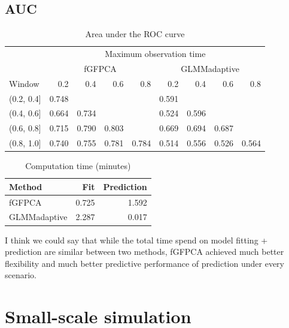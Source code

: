 \documentclass[
]{article}
\begin{document}
\hypertarget{auc}{%
\subsection{AUC}\label{auc}}

\begin{table}

\caption{\label{tab:unnamed-chunk-6}Area under the ROC curve}
\centering
\begin{tabular}[t]{lrrrrrrrr}
\toprule
\multicolumn{1}{c}{ } & \multicolumn{8}{c}{Maximum observation time} \\
\cmidrule(l{3pt}r{3pt}){2-9}
\multicolumn{1}{c}{ } & \multicolumn{4}{c}{fGFPCA} & \multicolumn{4}{c}{GLMMadaptive} \\
\cmidrule(l{3pt}r{3pt}){2-5} \cmidrule(l{3pt}r{3pt}){6-9}
Window & 0.2 & 0.4 & 0.6 & 0.8 & 0.2 & 0.4 & 0.6 & 0.8\\
\midrule
(0.2, 0.4] & 0.748 &  &  &  & 0.591 &  &  & \\
(0.4, 0.6] & 0.664 & 0.734 &  &  & 0.524 & 0.596 &  & \\
(0.6, 0.8] & 0.715 & 0.790 & 0.803 &  & 0.669 & 0.694 & 0.687 & \\
(0.8, 1.0] & 0.740 & 0.755 & 0.781 & 0.784 & 0.514 & 0.556 & 0.526 & 0.564\\
\bottomrule
\end{tabular}
\end{table}

\begin{table}

\caption{\label{tab:time}Computation time (minutes)}
\centering
\begin{tabular}[t]{lrr}
\toprule
Method & Fit & Prediction\\
\midrule
fGFPCA & 0.725 & 1.592\\
GLMMadaptive & 2.287 & 0.017\\
\bottomrule
\end{tabular}
\end{table}

I think we could say that while the total time spend on model fitting +
prediction are similar between two methods, fGFPCA achieved much better
flexibility and much better predictive performance of prediction under
every scenario.

\hypertarget{small-scale-simulation}{%
\section{Small-scale simulation}\label{small-scale-simulation}}
\end{document}
